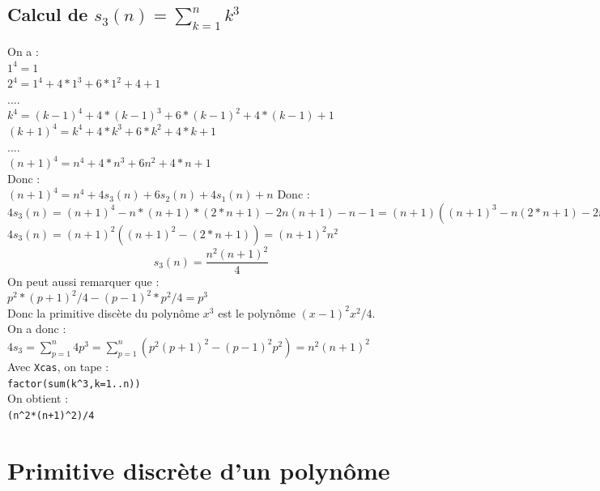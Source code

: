 \documentclass[a4paper,11pt]{book}
\begin{document}
\subsection{Calcul de $s_3(n)=\sum_{k=1}^nk^3$}
On a :\\
$1^4=1$\\
$2^4=1^4+4*1^3+6*1^2+4+1$\\
$....$\\
$k^4=(k-1)^4+4*(k-1)^3+6*(k-1)^2+4*(k-1)+1$\\
$(k+1)^4=k^4+4*k^3+6*k^2+4*k+1$\\
$....$\\
$(n+1)^4=n^4+4*n^3+6n^2+4*n+1$\\
Donc :\\
$(n+1)^4=n^4+4s_3(n)+6s_2(n)+4s_1(n)+n$
Donc :
$4s_3(n)= (n+1)^4-n*(n+1)*(2*n+1)-2n(n+1)-n-1=(n+1)((n+1)^3-n(2*n+1)-2n-1)$\\
$4s_3(n)=(n+1)^2((n+1)^2-(2*n+1))=(n+1)^2n^2$
$$s_3(n)=\frac{n^2(n+1)^2}{4}$$
On peut aussi remarquer que :\\
$p^2*(p+1)^2/4-(p-1)^2*p^2/4=p^3$\\
Donc la primitive disc\`ete du polyn\^ome
$x^3$ est le polyn\^ome $(x-1)^2x^2/4$.\\
On a donc :\\
$4s_3=\sum_{p=1}^n4p^3=\sum_{p=1}^n(p^2(p+1)^2-(p-1)^2p^2)=n^2(n+1)^2$\\
Avec {\tt Xcas}, on tape :\\
{\tt factor(sum(k\verb|^|3,k=1..n))}\\
On obtient :\\
{\tt (n\verb|^|2*(n+1)\verb|^|2)/4}
\section{Primitive discr\`ete d'un polyn\^ome}
\end{document}
